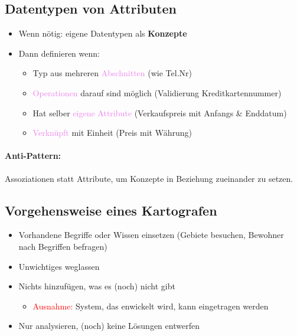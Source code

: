 \documentclass[../ZF_SWEN1.tex]{subfiles}
\begin{document}
\subsection{Datentypen von Attributen}

\begin{itemize}
	\item Wenn nötig: eigene Datentypen als \textbf{Konzepte}
	\item Dann definieren wenn:
	\begin{itemize}
		\item Typ aus mehreren \textcolor {violet}{Abschnitten} (wie Tel.Nr)
		\item \textcolor {violet} {Operationen} darauf sind möglich (Validierung Kreditkartennummer)
		\item Hat selber \textcolor {violet}{eigene Attribute} (Verkaufspreis mit Anfangs \& Enddatum)
		\item \textcolor {violet}{Verknüpft} mit Einheit (Preis mit Währung)
	\end{itemize}
	
\end{itemize}


\paragraph{Anti-Pattern:}

Assoziationen statt Attribute, um Konzepte in Beziehung zueinander zu setzen.

\subsection{Vorgehensweise eines Kartografen}

\begin{itemize}
	\item Vorhandene Begriffe oder Wissen einsetzen (Gebiete besuchen, Bewohner nach Begriffen befragen)
	\item Unwichtiges weglassen
	\item Nichts hinzufügen, was es (noch) nicht gibt 
	\begin{itemize}
		\item 	\textcolor {red} {Ausnahme:} System, das enwickelt wird, kann eingetragen werden
	\end{itemize}
	\item Nur analysieren, (noch) keine Lösungen entwerfen

\end{itemize}
\end{document}
